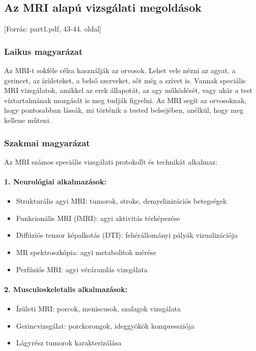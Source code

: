 \documentclass[a4paper,12pt]{article}
\begin{document}
\subsection{Az MRI alapú vizsgálati megoldások} [Forrás: part1.pdf, 43-44. oldal]

\subsubsection{Laikus magyarázat} Az MRI-t sokféle célra használják az orvosok. Lehet vele nézni az agyat, a gerincet, az ízületeket, a belső szerveket, sőt még a szívet is. Vannak speciális MRI vizsgálatok, amikkel az erek állapotát, az agy működését, vagy akár a test víztartalmának mozgását is meg tudják figyelni. Az MRI segít az orvosoknak, hogy pontosabban lássák, mi történik a tested belsejében, anélkül, hogy meg kellene műteni.

\subsubsection{Szakmai magyarázat} Az MRI számos speciális vizsgálati protokollt és technikát alkalmaz:

\paragraph{1. Neurológiai alkalmazások:} \begin{itemize} \item Strukturális agyi MRI: tumorok, stroke, demyelinizációs betegségek \item Funkcionális MRI (fMRI): agyi aktivitás térképezése \item Diffúziós tenzor képalkotás (DTI): fehérállományi pályák vizualizációja \item MR spektroszkópia: agyi metabolitok mérése \item Perfúziós MRI: agyi véráramlás vizsgálata \end{itemize}

\paragraph{2. Musculoskeletalis alkalmazások:} \begin{itemize} \item Ízületi MRI: porcok, meniscusok, szalagok vizsgálata \item Gerincvizsgálat: porckorongok, ideggyökök kompressziója \item Lágyrész tumorok karakterizálása \end{itemize}
\end{document}
